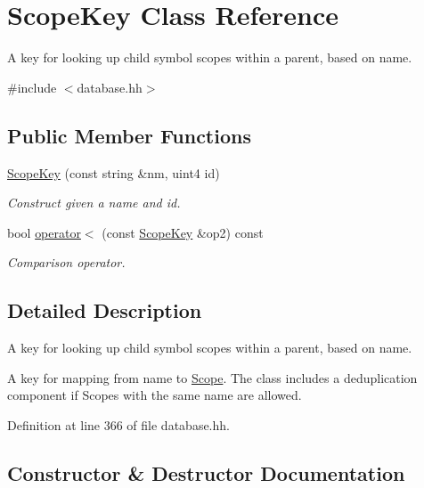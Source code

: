 \hypertarget{class_scope_key}{}\section{Scope\+Key Class Reference}
\label{class_scope_key}


A key for looking up child symbol scopes within a parent, based on name.  




{\ttfamily \#include $<$database.\+hh$>$}

\subsection*{Public Member Functions}
\begin{DoxyCompactItemize}
\item 
\mbox{\hyperlink{class_scope_key_a247f7b15475ffd5ac58320ab12d6e303}{Scope\+Key}} (const string \&nm, uint4 id)
\begin{DoxyCompactList}\small\item\em Construct given a name and id. \end{DoxyCompactList}\item 
bool \mbox{\hyperlink{class_scope_key_ad94de9bdec99a5a642a7c7d7f5b6b5ab}{operator$<$}} (const \mbox{\hyperlink{class_scope_key}{Scope\+Key}} \&op2) const
\begin{DoxyCompactList}\small\item\em Comparison operator. \end{DoxyCompactList}\end{DoxyCompactItemize}


\subsection{Detailed Description}
A key for looking up child symbol scopes within a parent, based on name. 

A key for mapping from name to \mbox{\hyperlink{class_scope}{Scope}}. The class includes a deduplication component if Scopes with the same name are allowed. 

Definition at line 366 of file database.\+hh.



\subsection{Constructor \& Destructor Documentation}
\mbox{\label{class_scope_key_a247f7b15475ffd5ac58320ab12d6e303}} 
